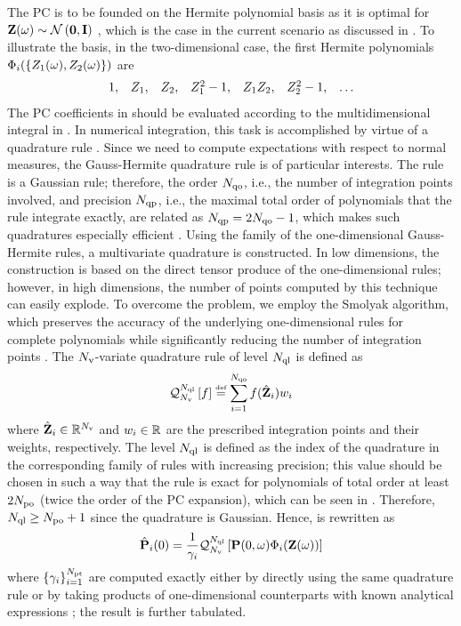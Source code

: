 The PC is to be founded on the Hermite polynomial basis as it is optimal for $\vZ(\o) \sim \normal{\vZero}{\mI}$ \cite{xiu2002}, which is the case in the current scenario as discussed in . To illustrate the basis, in the two-dimensional case, the first Hermite polynomials $\Phi_i(\{ Z_1(\omega), Z_2(\omega) \})$ are
\[
  \begin{array}{lllllll}
  1, & Z_1, & Z_2, & Z_1^2 - 1, & Z_1 Z_2, & Z_2^2 - 1, & \dotsc
  \end{array}
\]
The PC coefficients in  should be evaluated according to the multidimensional integral in . In numerical integration, this task is accomplished by virtue of a quadrature rule \cite{press2007}. Since we need to compute expectations with respect to normal measures, the Gauss-Hermite quadrature rule is of particular interests. The rule is a Gaussian rule; therefore, the order $N_\text{qo}$, i.e., the number of integration points involved, and precision $N_\text{qp}$, i.e., the maximal total order of polynomials that the rule integrate exactly, are related as $N_\text{qp} = 2 N_\text{qo} - 1$, which makes such quadratures especially efficient \cite{heiss2008}. Using the family of the one-dimensional Gauss-Hermite rules, a multivariate quadrature is constructed. In low dimensions, the construction is based on the direct tensor produce of the one-dimensional rules; however, in high dimensions, the number of points computed by this technique can easily explode. To overcome the problem, we employ the Smolyak algorithm, which preserves the accuracy of the underlying one-dimensional rules for complete polynomials while significantly reducing the number of integration points \cite{eldred2009, maitre2010, heiss2008}. The ${N_\text{v}}$-variate quadrature rule of level $N_\text{ql}$ is defined as
\[
  \mathcal{Q}_{{N_\text{v}}}^{N_\text{ql}}\left[f\right] \stackrel{\text{\tiny def}}{=} \sum_{i = 1}^{N_\text{qo}} f(\hat{\mathbf{Z}}_i) w_i
\]
where $\hat{\mathbf{Z}}_i \in \mathbb{R}^{N_\text{v}}$ and $w_i \in \mathbb{R}$ are the prescribed integration points and their weights, respectively. The level $N_\text{ql}$ is defined as the index of the quadrature in the corresponding family of rules with increasing precision; this value should be chosen in such a way that the rule is exact for polynomials of total order at least $2 {N_\text{po}}$ (twice the order of the PC expansion), which can be seen in  \cite{eldred2009}. Therefore, $N_\text{ql} \geq {N_\text{po}} + 1$ since the quadrature is Gaussian. Hence,  is rewritten as
\[
  \hat{\mathbf{P}}_i(0) = \frac{1}{\gamma_i} \mathcal{Q}_{{N_\text{v}}}^{N_\text{ql}}\left[\mathbf{P}(0, \omega) \Phi_i(\mathbf{Z}(\omega))\right]
\]
where $\{ \gamma_i \}_{i = 1}^{{N_\text{pt}}}$ are computed exactly either by directly using the same quadrature rule or by taking products of one-dimensional counterparts with known analytical expressions \cite{xiu2010}; the result is further tabulated.

